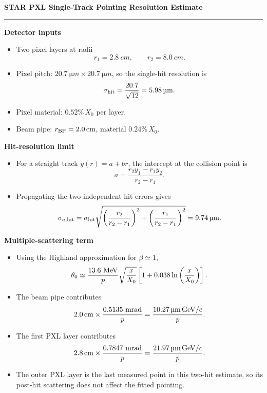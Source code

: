 \documentclass[10pt]{article}
\begin{document}
\begin{center}
{\Large \textbf{STAR PXL Single-Track Pointing Resolution Estimate}}\\[0.3em]
{\color{accent}\rule{0.92\linewidth}{0.8pt}}
\end{center}

\textbf{Detector inputs}
\begin{itemize}
  \item Two pixel layers at radii
  \[
    r_1=\SI{2.8}{cm}, \qquad r_2=\SI{8.0}{cm}.
  \]
  \item Pixel pitch: \(\SI{20.7}{\micro m}\times\SI{20.7}{\micro m}\), so the single-hit resolution is
  \[
    \sigma_{\rm hit}=\frac{20.7}{\sqrt{12}}=\SI{5.98}{\micro m}.
  \]
  \item Pixel material: \(0.52\%\,X_0\) per layer.
  \item Beam pipe: \(r_{\rm BP}=\SI{2.0}{cm}\), material \(0.24\%\,X_0\).
\end{itemize}

\textbf{Hit-resolution limit}
\begin{itemize}
  \item For a straight track \(y(r)=a+br\), the intercept at the collision point is
  \[
    a = \frac{r_2 y_1-r_1 y_2}{r_2-r_1}.
  \]
  \item Propagating the two independent hit errors gives
  \[
    \sigma_{a,{\rm hit}}
    =
    \sigma_{\rm hit}
    \sqrt{
      \left(\frac{r_2}{r_2-r_1}\right)^2+
      \left(\frac{r_1}{r_2-r_1}\right)^2
    }
    =
    \SI{9.74}{\micro m}.
  \]
\end{itemize}

\textbf{Multiple-scattering term}
\begin{itemize}
  \item Using the Highland approximation for \(\beta\simeq 1\),
  \[
    \theta_0
    \simeq
    \frac{13.6~{\rm MeV}}{p}
    \sqrt{\frac{x}{X_0}}
    \left[1+0.038\ln\left(\frac{x}{X_0}\right)\right].
  \]
  \item The beam pipe contributes
  \[
    \SI{2.0}{cm}\times\frac{0.5135~{\rm mrad}}{p}
    =
    \frac{\SI{10.27}{\micro m\,GeV}/c}{p}.
  \]
  \item The first PXL layer contributes
  \[
    \SI{2.8}{cm}\times\frac{0.7847~{\rm mrad}}{p}
    =
    \frac{\SI{21.97}{\micro m\,GeV}/c}{p}.
  \]
  \item The outer PXL layer is the last measured point in this two-hit estimate, so its post-hit scattering does not affect the fitted pointing.
\end{itemize}
\end{document}

